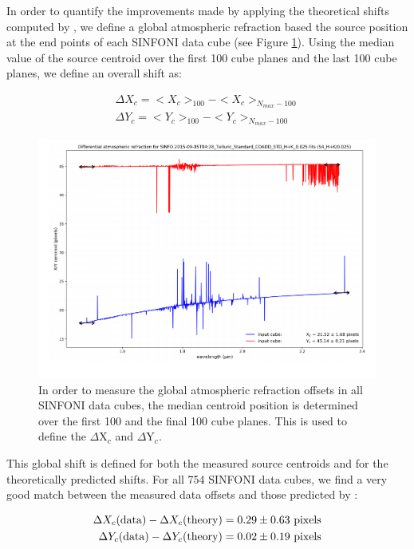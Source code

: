 In order to quantify the improvements made by applying the theoretical shifts computed by \hdrldar, we define a global atmospheric refraction based the source
position at the end points of each SINFONI data cube (see Figure \ref{fig:global_offsets}).   Using the median value of the source centroid over the first 100 cube planes 
and the last 100 cube planes, we define an overall shift as: 

\begin{align}
\Delta X_c = <X_c> _{100} -  <X_c> _{N_{max} - 100}    \\
\Delta Y_c = <Y_c> _{100} -  <Y_c> _{N_{max} - 100}
\end{align}


\begin{figure}[H]
\centering \subfigure
\includegraphics[width=16cm]{figures/define_global_offset.pdf} 
\caption[]
	{\footnotesize  In order to measure the global atmospheric refraction offsets in all SINFONI data cubes, the median centroid position is determined over the first
	100 and the final 100 cube planes.   This is used to define the $\Delta$X$_c$ and $\Delta$Y$_c$.
	}
	\label{fig:global_offsets}
\end{figure}


This global shift is defined for both the measured source centroids and for the theoretically predicted shifts.  For all 754 SINFONI data cubes, we find a very good
match between the measured data offsets and those predicted by \hdrldar:

\begin{align}
\Delta X_c ({\rm data}) -  \Delta X_c ({\rm theory})  = 0.29 \pm 0.63\ {\rm pixels}  \\
\Delta Y_c ({\rm data}) -  \Delta Y_c ({\rm theory})  = 0.02 \pm 0.19\ {\rm pixels}
\end{align}

